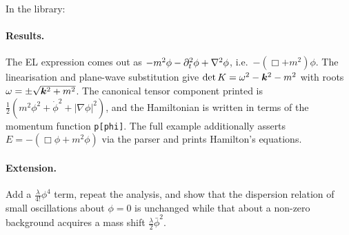 In the library:


\paragraph{Results.} The EL expression comes out as $-m^2\phi-\partial_t^2\phi+\nabla^2\phi$, i.e.\ $-(\Box+m^2)\phi$. The linearisation and plane-wave substitution give $\det K=\omega^2-\bm{k}^2-m^2$ with roots $\omega=\pm\sqrt{\bm{k}^2+m^2}$. The canonical tensor component printed is $\tfrac12(m^2\phi^2+\dot\phi^2+|\nabla\phi|^2)$, and the Hamiltonian is written in terms of the momentum function \texttt{p[phi]}. The full example additionally asserts $E=-(\Box\phi+m^2\phi)$ via the parser and prints Hamilton's equations.

\paragraph{Extension.} Add a $\tfrac{\lambda}{4!}\phi^4$ term, repeat the analysis, and show that the dispersion relation of small oscillations about $\phi=0$ is unchanged while that about a non-zero background acquires a mass shift $\tfrac\lambda2\bar\phi^2$.



